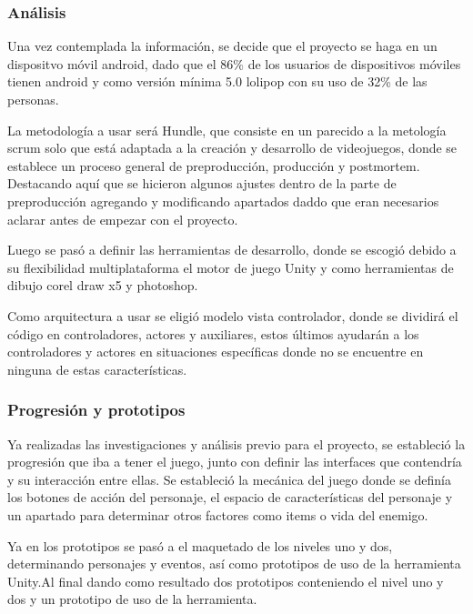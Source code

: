 \subsubsection{Análisis}\label{analisis}
Una vez contemplada la información, se decide que el proyecto se haga en un dispositvo móvil android, dado que el 86\% de los usuarios de dispositivos móviles tienen android y como versión mínima 5.0 lolipop con su uso de 32\% de las personas.

La metodología a usar será Hundle, que consiste en un parecido a la metología scrum solo que está adaptada a la creación y desarrollo de videojuegos, donde se establece un proceso general de preproducción,  producción y postmortem. Destacando aquí que se hicieron algunos ajustes dentro de la parte de preproducción agregando y modificando apartados daddo que eran necesarios aclarar antes de empezar con el proyecto.

Luego se pasó a definir las herramientas de desarrollo, donde se escogió debido a su flexibilidad multiplataforma el motor de juego Unity y como herramientas de dibujo corel draw x5 y photoshop.

Como arquitectura a usar se eligió modelo vista controlador, donde se dividirá el código en controladores, actores y auxiliares, estos últimos ayudarán a los controladores y actores en situaciones específicas donde no se encuentre en ninguna de estas características.

\subsubsection{Progresión y prototipos}\label{proypro}
Ya realizadas las investigaciones y análisis previo para el proyecto, se estableció la progresión que iba a tener el juego, junto con definir las interfaces que contendría y su interacción entre ellas.
Se estableció la mecánica del juego donde se definía los botones de acción del personaje, el espacio de características del personaje y un apartado para determinar otros factores como items o vida del enemigo.

Ya en los prototipos se pasó a el maquetado de los niveles uno y dos, determinando personajes y eventos, así como prototipos de uso de la herramienta Unity.Al final dando como resultado dos prototipos conteniendo el nivel uno y dos y un prototipo de uso de la herramienta.